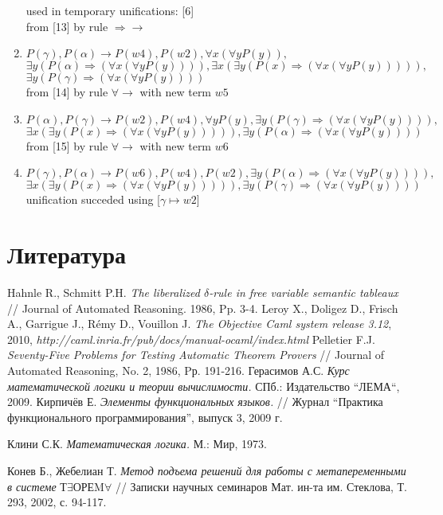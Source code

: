 \documentclass{cw1}
\begin{document}
\begin{enumerate}
  used in temporary unifications: [6]\\
 from [13] by rule $\Rightarrow \rightarrow$
\item $P(\gamma),P(\alpha)\rightarrow P(w4), P(w2),\forall x(\forall y P(y)),$\\$\exists y (P(\alpha)\Rightarrow(\forall x (\forall y P(y)))),\exists  x (\exists y (P(x)\Rightarrow(\forall  x (\forall  y P(y))))),$\\$\exists  y (P(\gamma) \Rightarrow (\forall x (\forall y P(y))))$\\
 from [14] by rule $\forall \rightarrow $ with new term $w5$
\item $P(\alpha), P(\gamma) \rightarrow  P(w2), P(w4),  \forall y P(y),\exists y (P(\gamma) \Rightarrow (\forall  x (\forall y P(y)))),$\\$\exists x (\exists y (P(x)\Rightarrow(\forall  x (\forall y P(y))))), \exists  y (P(\alpha)  \Rightarrow  ( \forall  x ( \forall  y P(y))))$\\
 from [15] by rule $\forall \rightarrow $ with new term $w6$
\item $P(\gamma), P(\alpha) \rightarrow  P(w6), P(w4), P(w2),  \exists  y (P(\alpha)\Rightarrow (\forall  x (\forall  y P(y)))),$\\$\exists  x ( \exists  y (P(x)  \Rightarrow  ( \forall  x ( \forall  y P(y))))),  \exists  y (P(\gamma)  \Rightarrow  ( \forall  x ( \forall  y P(y))))$\\
 unification succeded using [$\gamma \mapsto w2$]
\end{enumerate}

\newpage
\section{Литература}
\begin{thebibliography}{9}
        Hahnle R., Schmitt P.H. \textit{The liberalized $\delta$-rule in free variable semantic tableaux} //
        Journal of Automated Reasoning. 1986, Pp. 3-4.
        Leroy X., Doligez D., Frisch A., Garrigue J., Rémy D.,  Vouillon J.
        \textit{The Objective Caml system release 3.12}, 2010, \textit{http://caml.inria.fr/pub/docs/manual-ocaml/index.html}
        Pelletier F.J. \textit{Seventy-Five Problems for Testing Automatic Theorem Provers} //
        Journal of Automated Reasoning, No. 2, 1986, Pр. 191-216.
        Герасимов А.С. \textit{Курс математической логики и теории вычислимости.}
        СПб.: Издательство ``ЛЕМА``, 2009.
        Кирпичёв Е. \textit{Элементы функциональных языков.} // Журнал ``Практика функционального
        программирования'', выпуск 3, 2009 г.
        
        Клини С.К. \textit{Математическая логика.} М.: Мир, 1973.
        
          Конев Б., Жебелиан Т.
          \textit{Метод подъема решений для работы с метапеременными в системе} Т$\exists$ОРЕM$\forall$ //
          Записки научных семинаров Мат. ин-та им. Стеклова, Т. 293, 2002, с. 94-117.


\end{thebibliography}
\end{document}
